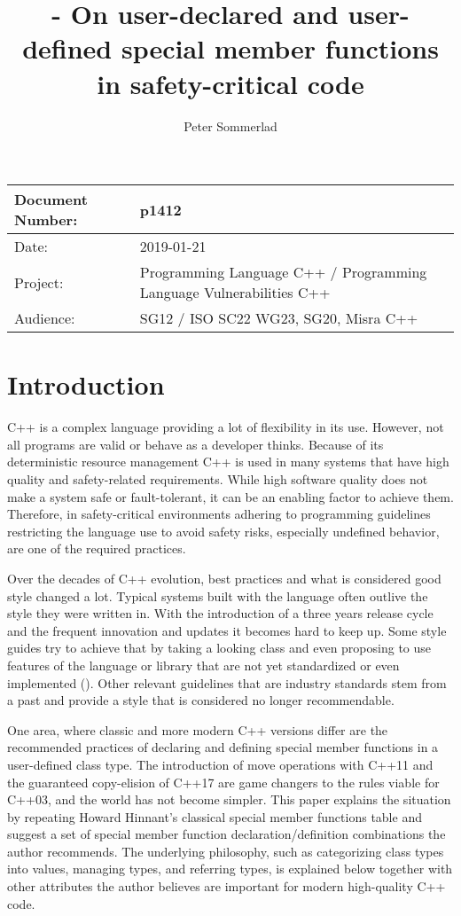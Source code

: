 \documentclass[ebook,11pt,article]{memoir}
\title{\papernumber{} - On user-declared and user-defined special member functions in safety-critical code}
\author{Peter Sommerlad}
\date{\paperdate}                %
\newcommand{\papernumber}{p1412}
\newcommand{\paperdate}{2019-01-21}
\begin{document}
\maketitle
\begin{center}
\begin{tabular}[t]{|l|l|}\hline 
Document Number:&  \papernumber \\\hline
Date: & \paperdate \\\hline
Project: & Programming Language C++ / Programming Language Vulnerabilities C++\\\hline 
Audience: & SG12 / ISO SC22 WG23, SG20, Misra C++\\\hline
\end{tabular}
\end{center}
\chapter{Introduction}

C++ is a complex language providing a lot of flexibility in its use. However, not all programs are valid or behave as a developer thinks. Because of its deterministic resource management C++ is used in many systems that have high quality and safety-related requirements. While high software quality does not make a system safe or fault-tolerant, it can be an enabling factor to achieve them. Therefore, in safety-critical environments adhering to programming guidelines restricting the language use to avoid safety risks, especially undefined behavior, are one of the required practices.

Over the decades of C++ evolution, best practices and what is considered good style changed a lot. Typical systems built with the language often outlive the style they were written in. With the introduction of a three years release cycle and the frequent innovation and updates it becomes hard to keep up. Some style guides try to achieve that by taking a looking class and even proposing to use features of the language or library that are not yet standardized or even implemented (\cite{CoreGuidelines}). Other relevant guidelines that are industry standards stem from a past and provide a style that is considered no longer recommendable.

One area, where classic and more modern C++ versions differ are the recommended practices of declaring and defining special member functions in a user-defined class type. The introduction of move operations with C++11 and the guaranteed copy-elision of C++17 are game changers to the rules viable for C++03, and the world has not become simpler. This paper explains the situation by repeating Howard Hinnant's classical special member functions table and suggest a set of special member function declaration/definition combinations the author recommends. The underlying philosophy, such as categorizing class types into values, managing types, and referring types, is explained below together with other attributes the author believes are important for modern high-quality C++ code.
\end{document}
